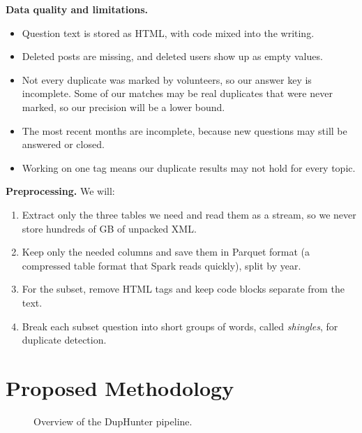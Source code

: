 \documentclass[11pt,a4paper]{article}
\begin{document}
\textbf{Data quality and limitations.}
\begin{itemize}
  \item Question text is stored as HTML, with code mixed into the writing.
  \item Deleted posts are missing, and deleted users show up as empty values.
  \item Not every duplicate was marked by volunteers, so our answer key is
        incomplete. Some of our matches may be real duplicates that were never
        marked, so our precision will be a lower bound.
  \item The most recent months are incomplete, because new questions may still
        be answered or closed.
  \item Working on one tag means our duplicate results may not hold for every
        topic.
\end{itemize}

\textbf{Preprocessing.} We will:
\begin{enumerate}
  \item Extract only the three tables we need and read them as a stream, so we
        never store hundreds of GB of unpacked XML.
  \item Keep only the needed columns and save them in Parquet format (a
        compressed table format that Spark reads quickly), split by year.
  \item For the subset, remove HTML tags and keep code blocks separate from the
        text.
  \item Break each subset question into short groups of words, called
        \emph{shingles}, for duplicate detection.
\end{enumerate}

\section{Proposed Methodology}

\begin{figure}[H]
\centering
{}
\caption{Overview of the DupHunter pipeline.}
\label{fig:pipeline}
\end{figure}
\end{document}
